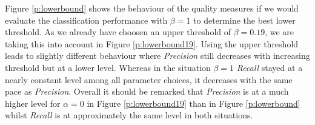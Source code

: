 


Figure \ref{p:lowerbound} shows the behaviour of the quality measures if we would evaluate the classification performance with $\beta=1$ to determine the best lower threshold.
As we already have choosen an upper threshold of $\beta = 0.19$, we are taking this into account in Figure \ref{p:lowerbound19}.
Using the upper threshold leads to slightly different behaviour where \emph{Precision} still decreases with increasing threshold but at a lower level.
Whereas in the situation $\beta = 1$ \emph{Recall} stayed at a nearly constant level among all parameter choices, it decreases with the same pace as \emph{Precision}.
Overall it should be remarked that \emph{Precision} is at a much higher level for $\alpha = 0$ in Figure \ref{p:lowerbound19} than in Figure \ref{p:lowerbound} whilst \emph{Recall} is at approximately the same level in both situations.




% 

